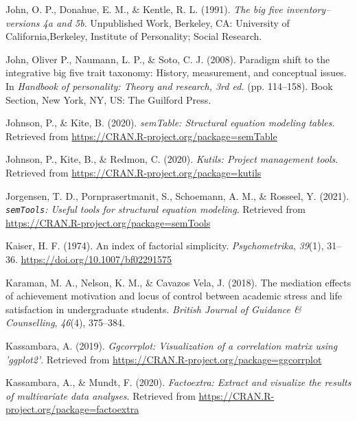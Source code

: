 \documentclass[
  english,
  man]{apa6}
\newlength{\cslhangindent}
\newlength{\cslentryspacingunit} %
\newenvironment{CSLReferences}[2] %
 {%
  \setlength{\parindent}{0pt}
  \ifodd #1
  \let\oldpar\par
  \def\par{\hangindent=\cslhangindent\oldpar}
  \fi
  \setlength{\parskip}{#2\cslentryspacingunit}
 }%
 {}
\begin{document}
\begin{CSLReferences}{1}{0}
\leavevmode{}%
John, O. P., Donahue, E. M., \& Kentle, R. L. (1991). \emph{The big five inventory--versions 4a and 5b}. Unpublished Work, Berkeley, CA: University of California,Berkeley, Institute of Personality; Social Research.

\leavevmode{}%
John, Oliver P., Naumann, L. P., \& Soto, C. J. (2008). Paradigm shift to the integrative big five trait taxonomy: History, measurement, and conceptual issues. In \emph{Handbook of personality: Theory and research, 3rd ed.} (pp. 114--158). Book Section, New York, NY, US: The Guilford Press.

\leavevmode{}%
Johnson, P., \& Kite, B. (2020). \emph{semTable: Structural equation modeling tables}. Retrieved from \url{https://CRAN.R-project.org/package=semTable}

\leavevmode{}%
Johnson, P., Kite, B., \& Redmon, C. (2020). \emph{Kutils: Project management tools}. Retrieved from \url{https://CRAN.R-project.org/package=kutils}

\leavevmode{}%
Jorgensen, T. D., Pornprasertmanit, S., Schoemann, A. M., \& Rosseel, Y. (2021). \emph{\texttt{semTools}: {U}seful tools for structural equation modeling}. Retrieved from \url{https://CRAN.R-project.org/package=semTools}

\leavevmode{}%
Kaiser, H. F. (1974). An index of factorial simplicity. \emph{Psychometrika}, \emph{39}(1), 31--36. \url{https://doi.org/10.1007/bf02291575}

\leavevmode{}%
Karaman, M. A., Nelson, K. M., \& Cavazos Vela, J. (2018). The mediation effects of achievement motivation and locus of control between academic stress and life satisfaction in undergraduate students. \emph{British Journal of Guidance \& Counselling}, \emph{46}(4), 375--384.

\leavevmode{}%
Kassambara, A. (2019). \emph{Ggcorrplot: Visualization of a correlation matrix using 'ggplot2'}. Retrieved from \url{https://CRAN.R-project.org/package=ggcorrplot}

\leavevmode{}%
Kassambara, A., \& Mundt, F. (2020). \emph{Factoextra: Extract and visualize the results of multivariate data analyses}. Retrieved from \url{https://CRAN.R-project.org/package=factoextra}


\end{CSLReferences}
\end{document}
